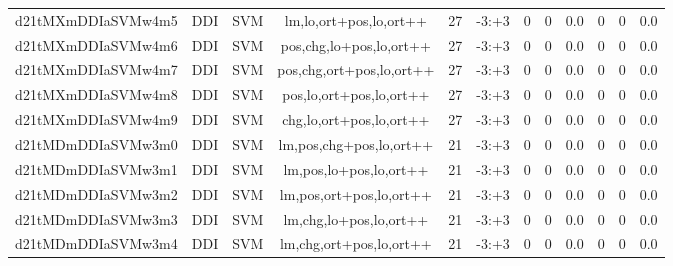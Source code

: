 \documentclass[a4paper]{article}
\begin{document}
\begin{landscape}
\begin{center}
\begin{tabular}{ |c|c|c|c|c|c|c|c|c|c|c|c|}
 
 	
 	\small{ d21tMXmDDIaSVMw4m5 } & \small{ DDI} & \small{  SVM }  & lm,lo,ort+pos,lo,ort++  &  27 &  \small{  -3:+3 }  &  0 & 0 & 0.0  &  0 & 0 & 0.0 \\
 	

 
 	
 	\small{ d21tMXmDDIaSVMw4m6 } & \small{ DDI} & \small{  SVM }  & pos,chg,lo+pos,lo,ort++  &  27 &  \small{  -3:+3 }  &  0 & 0 & 0.0  &  0 & 0 & 0.0 \\
 	

 
 	
 	\small{ d21tMXmDDIaSVMw4m7 } & \small{ DDI} & \small{  SVM }  & pos,chg,ort+pos,lo,ort++  &  27 &  \small{  -3:+3 }  &  0 & 0 & 0.0  &  0 & 0 & 0.0 \\
 	

 
 	
 	\small{ d21tMXmDDIaSVMw4m8 } & \small{ DDI} & \small{  SVM }  & pos,lo,ort+pos,lo,ort++  &  27 &  \small{  -3:+3 }  &  0 & 0 & 0.0  &  0 & 0 & 0.0 \\
 	

 
 	
 	\small{ d21tMXmDDIaSVMw4m9 } & \small{ DDI} & \small{  SVM }  & chg,lo,ort+pos,lo,ort++  &  27 &  \small{  -3:+3 }  &  0 & 0 & 0.0  &  0 & 0 & 0.0 \\
 	

 
 	
 	\small{ d21tMDmDDIaSVMw3m0 } & \small{ DDI} & \small{  SVM }  & lm,pos,chg+pos,lo,ort++  &  21 &  \small{  -3:+3 }  &  0 & 0 & 0.0  &  0 & 0 & 0.0 \\
 	

 
 	
 	\small{ d21tMDmDDIaSVMw3m1 } & \small{ DDI} & \small{  SVM }  & lm,pos,lo+pos,lo,ort++  &  21 &  \small{  -3:+3 }  &  0 & 0 & 0.0  &  0 & 0 & 0.0 \\
 	

 
 	
 	\small{ d21tMDmDDIaSVMw3m2 } & \small{ DDI} & \small{  SVM }  & lm,pos,ort+pos,lo,ort++  &  21 &  \small{  -3:+3 }  &  0 & 0 & 0.0  &  0 & 0 & 0.0 \\
 	

 
 	
 	\small{ d21tMDmDDIaSVMw3m3 } & \small{ DDI} & \small{  SVM }  & lm,chg,lo+pos,lo,ort++  &  21 &  \small{  -3:+3 }  &  0 & 0 & 0.0  &  0 & 0 & 0.0 \\
 	

 
 	
 	\small{ d21tMDmDDIaSVMw3m4 } & \small{ DDI} & \small{  SVM }  & lm,chg,ort+pos,lo,ort++  &  21 &  \small{  -3:+3 }  &  0 & 0 & 0.0  &  0 & 0 & 0.0 \\
 	


\end{tabular}
\end{center}
\end{landscape}
\end{document}
